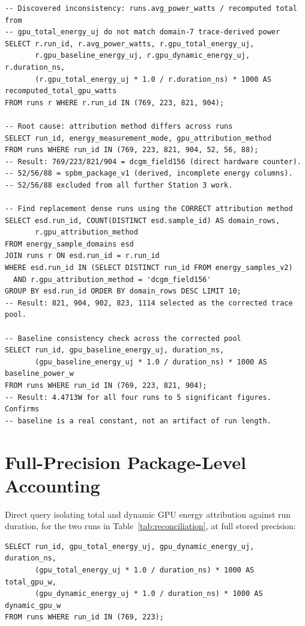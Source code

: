\documentclass[10pt]{article}
\begin{document}
\begin{lstlisting}
-- Discovered inconsistency: runs.avg_power_watts / recomputed total from
-- gpu_total_energy_uj do not match domain-7 trace-derived power
SELECT r.run_id, r.avg_power_watts, r.gpu_total_energy_uj,
       r.gpu_baseline_energy_uj, r.gpu_dynamic_energy_uj, r.duration_ns,
       (r.gpu_total_energy_uj * 1.0 / r.duration_ns) * 1000 AS recomputed_total_gpu_watts
FROM runs r WHERE r.run_id IN (769, 223, 821, 904);

-- Root cause: attribution method differs across runs
SELECT run_id, energy_measurement_mode, gpu_attribution_method
FROM runs WHERE run_id IN (769, 223, 821, 904, 52, 56, 88);
-- Result: 769/223/821/904 = dcgm_field156 (direct hardware counter).
-- 52/56/88 = spbm_package_v1 (derived, incomplete energy columns).
-- 52/56/88 excluded from all further Station 3 work.

-- Find replacement dense runs using the CORRECT attribution method
SELECT esd.run_id, COUNT(DISTINCT esd.sample_id) AS domain_rows,
       r.gpu_attribution_method
FROM energy_sample_domains esd
JOIN runs r ON esd.run_id = r.run_id
WHERE esd.run_id IN (SELECT DISTINCT run_id FROM energy_samples_v2)
  AND r.gpu_attribution_method = 'dcgm_field156'
GROUP BY esd.run_id ORDER BY domain_rows DESC LIMIT 10;
-- Result: 821, 904, 902, 823, 1114 selected as the corrected trace pool.

-- Baseline consistency check across the corrected pool
SELECT run_id, gpu_baseline_energy_uj, duration_ns,
       (gpu_baseline_energy_uj * 1.0 / duration_ns) * 1000 AS baseline_power_w
FROM runs WHERE run_id IN (769, 223, 821, 904);
-- Result: 4.4713W for all four runs to 5 significant figures. Confirms
-- baseline is a real constant, not an artifact of run length.
\end{lstlisting}

\section{Full-Precision Package-Level Accounting}
\label{app:variance}

Direct query isolating total and dynamic GPU energy attribution against
run duration, for the two runs in Table~\ref{tab:reconciliation}, at full
stored precision:

\begin{lstlisting}
SELECT run_id, gpu_total_energy_uj, gpu_dynamic_energy_uj, duration_ns,
       (gpu_total_energy_uj * 1.0 / duration_ns) * 1000 AS total_gpu_w,
       (gpu_dynamic_energy_uj * 1.0 / duration_ns) * 1000 AS dynamic_gpu_w
FROM runs WHERE run_id IN (769, 223);
\end{lstlisting}
\end{document}

